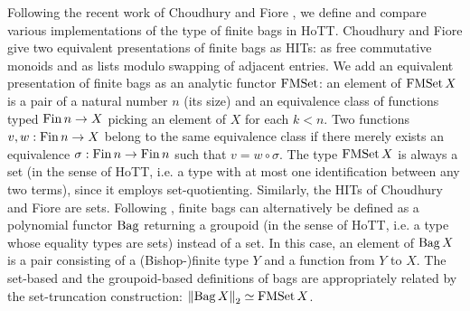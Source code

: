 \documentclass[final,a4paper,USenglish,cleveref]{lipics-v2021}
\begin{document}
Following the recent work of Choudhury and Fiore \cite{Choudhury2021}, we define and compare various implementations of the type of finite bags in HoTT. Choudhury and Fiore give two equivalent presentations of finite bags as HITs: as free commutative monoids and as lists modulo swapping of adjacent entries. We add an equivalent presentation of finite bags as an analytic functor $\FMSet$: an element of $\FMSet X$ is a pair of a natural number $n$ (its size) and an equivalence class of functions typed $\Fin n \to X$ picking an element of $X$ for each $k < n$. Two functions $v ,w :\Fin n \to X$ belong to the same equivalence class if there merely exists an equivalence $\sigma : \Fin n \to \Fin n$ such that $v = w \circ \sigma$. The type $\FMSet X$ is always a set (in the sense of HoTT, i.e. a type with at most one identification between any two terms), since it employs set-quotienting. Similarly, the HITs of Choudhury and Fiore are sets. Following \cite{Kock2012}, finite bags can alternatively be defined as a polynomial functor $\Bag$ returning a groupoid (in the sense of HoTT, i.e. a type whose equality types are sets) instead of a set. In this case, an element of $\Bag X$ is a pair consisting of a (Bishop-)finite type $Y$ and a function from $Y$ to $X$. The set-based and the groupoid-based definitions of bags are appropriately related by the set-truncation construction: $\SetTrunc{\Bag X} \simeq \FMSet X$.
\end{document}
